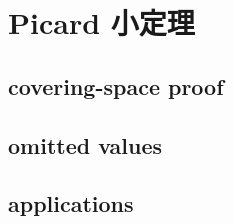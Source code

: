 \section{Picard 小定理}
\label{b3:sec:1404}


\subsection{covering-space proof}
\label{b3:subsec:140401}

\subsection{omitted values}
\label{b3:subsec:140402}

\subsection{applications}
\label{b3:subsec:140403}


